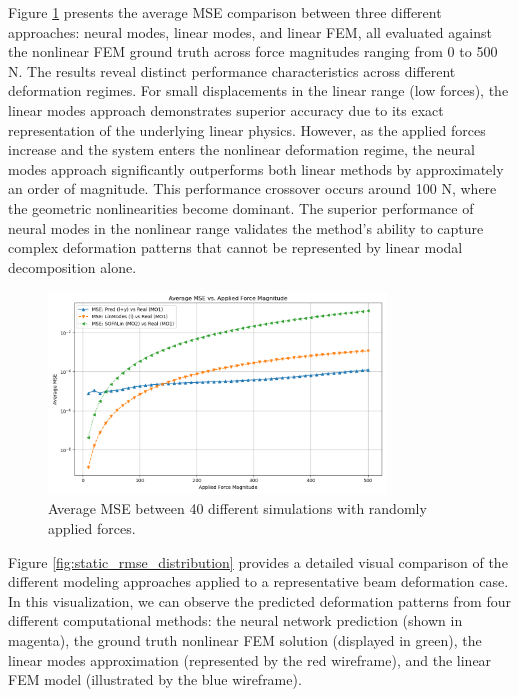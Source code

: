 Figure \ref{fig:static_mse_comparison} presents the average MSE comparison between three different approaches: neural modes, linear modes, and linear FEM, all evaluated against the nonlinear FEM ground truth across force magnitudes ranging from 0 to 500 N. The results reveal distinct performance characteristics across different deformation regimes. For small displacements in the linear range (low forces), the linear modes approach demonstrates superior accuracy due to its exact representation of the underlying linear physics. However, as the applied forces increase and the system enters the nonlinear deformation regime, the neural modes approach significantly outperforms both linear methods by approximately an order of magnitude. This performance crossover occurs around 100 N, where the geometric nonlinearities become dominant. The superior performance of neural modes in the nonlinear range validates the method's ability to capture complex deformation patterns that cannot be represented by linear modal decomposition alone.

\begin{figure}[H]
    \centering
    \includegraphics[width=0.8\textwidth]{Images/beam_static_mse.png}
    \caption{Average MSE between 40 different simulations with randomly applied forces.}
    \label{fig:static_mse_comparison}
\end{figure}

Figure \ref{fig:static_rmse_distribution} provides a detailed visual comparison of the different modeling approaches applied to a representative beam deformation case. In this visualization, we can observe the predicted deformation patterns from four different computational methods: the neural network prediction (shown in magenta), the ground truth nonlinear FEM solution (displayed in green), the linear modes approximation (represented by the red wireframe), and the linear FEM model (illustrated by the blue wireframe). 

